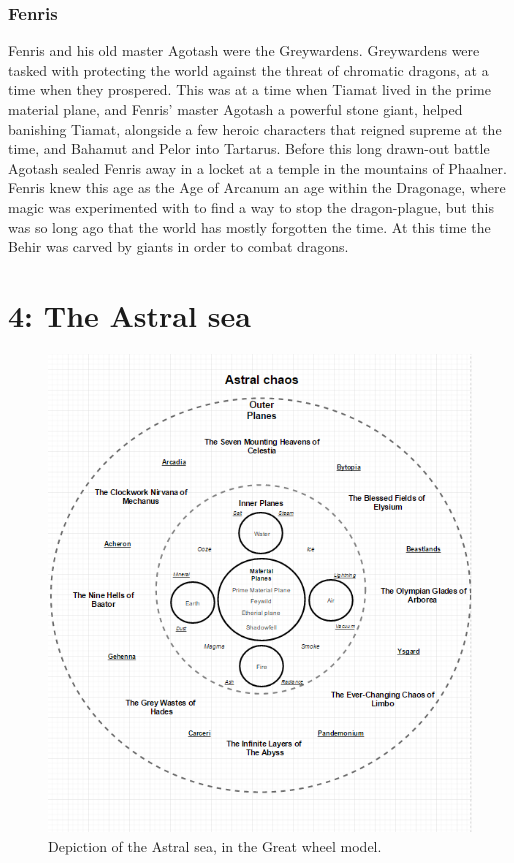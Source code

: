 \documentclass[a4paper]{article}
\begin{document}
\subsubsection{Fenris}
Fenris and his old master Agotash were the Greywardens. Greywardens were tasked with protecting the world against the threat of chromatic dragons, at a time when they prospered. This was at a time when Tiamat lived in the prime material plane, and Fenris' master Agotash a powerful stone giant, helped banishing Tiamat, alongside a few heroic characters that reigned supreme at the time, and Bahamut and Pelor into Tartarus. Before this long drawn-out battle Agotash sealed Fenris away in a locket at a temple in the mountains of Phaalner. Fenris knew this age as the Age of Arcanum an age within the Dragonage, where magic was experimented with to find a way to stop the dragon-plague, but this was so long ago that the world has mostly forgotten the time. At this time the Behir was carved by giants in order to combat dragons.

\section{4: The Astral sea}
\begin{figure}[h]
\begin{center}
\includegraphics[scale=0.8]{TheAstralSea}
\caption{Depiction of the Astral sea, in the Great wheel model.}\label{TheAstralSea}
\end{center}
\end{figure}
\end{document}

